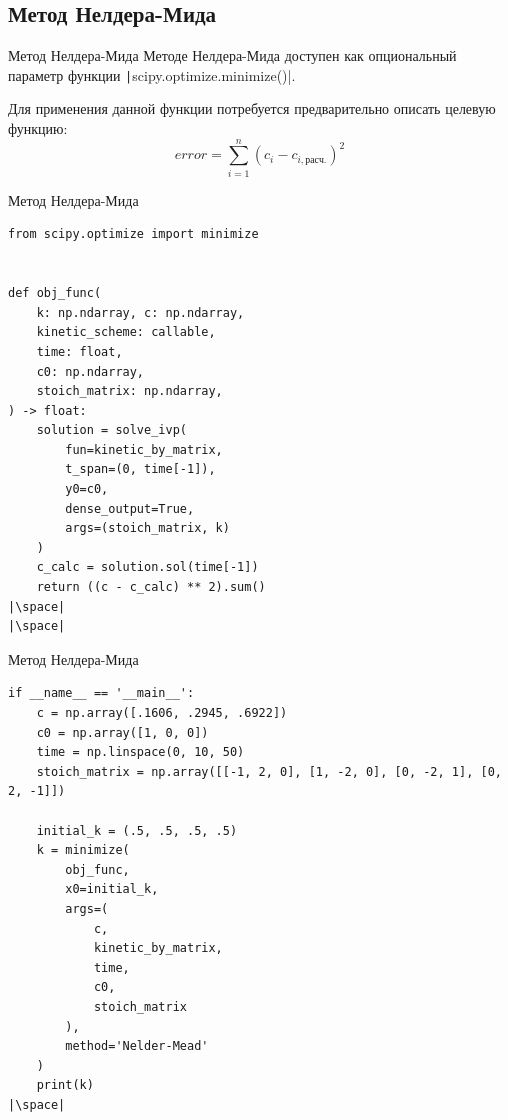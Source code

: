 \documentclass[aspectratio=169, mathserif]{beamer}	%
\begin{document}
\subsection{Метод Нелдера-Мида}
\begin{frame}[fragile, label=c]{Метод Нелдера-Мида}
\scriptsize
Методе Нелдера-Мида доступен как опциональный параметр функции \texttt|scipy.optimize.minimize()|.

Для применения данной функции потребуется предварительно описать целевую функцию:
\vfill
$$
	error = \sum \limits _{i=1} ^{n} \left(c_i - c_{i, \mathrm{расч.}}\right)^2
$$
\vfill
\end{frame}


\begin{frame}[fragile, label=c]{Метод Нелдера-Мида}
\scriptsize
\begin{verbatim}
from scipy.optimize import minimize


def obj_func(
    k: np.ndarray, c: np.ndarray,
    kinetic_scheme: callable,
    time: float,
    c0: np.ndarray,
    stoich_matrix: np.ndarray,
) -> float:
    solution = solve_ivp(
        fun=kinetic_by_matrix,
        t_span=(0, time[-1]),
        y0=c0,
        dense_output=True,
        args=(stoich_matrix, k)
    )
    c_calc = solution.sol(time[-1])
    return ((c - c_calc) ** 2).sum()
|\space|
|\space|
\end{verbatim}
\vfill
\end{frame}


\begin{frame}[fragile, label=c]{Метод Нелдера-Мида}
\scriptsize
\begin{verbatim}
if __name__ == '__main__':
    c = np.array([.1606, .2945, .6922])
    c0 = np.array([1, 0, 0])
    time = np.linspace(0, 10, 50)
    stoich_matrix = np.array([[-1, 2, 0], [1, -2, 0], [0, -2, 1], [0, 2, -1]])

    initial_k = (.5, .5, .5, .5)
    k = minimize(
        obj_func,
        x0=initial_k,
        args=(
            c,
            kinetic_by_matrix,
            time,
            c0,
            stoich_matrix
        ),
        method='Nelder-Mead'
    )
    print(k)
|\space|
\end{verbatim}
\vfill
\end{frame}
\end{document}
